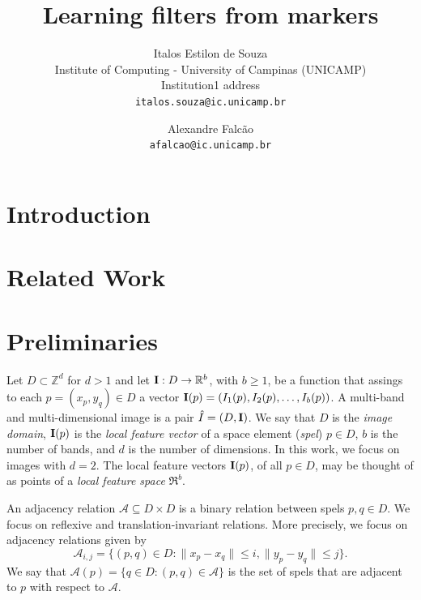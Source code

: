 \documentclass[10pt,twocolumn,letterpaper]{article}
\newcommand{\R}{\mathbb{R}}
\newcommand{\A}{\mathcal{A}}
\newcommand{\Z}{\mathbb{Z}}
\newcommand{\m}[1]{{\mathrm{\bf #1}}}
\begin{document}
\title{Learning filters from markers}
\author{Italos Estilon de Souza\\
Institute of Computing - University of Campinas (UNICAMP)\\
Institution1 address\\
{\tt\small italos.souza@ic.unicamp.br}
\and
Alexandre Falcão\\
{\tt\small afalcao@ic.unicamp.br}
}

\maketitle



\section{Introduction}

\section{Related Work}

\section{Preliminaries}

Let $D \subset \Z^d$ for $d > 1$ and let $\m{I}: D \to \R^b$, with $b \ge 1$, be a function that assings to each $p = (x_p, y_q) \in D$ a vector $\m{I}(p) = (I_1(p), I_2(p), \ldots, I_b(p))$.
A multi-band and multi-dimensional image is a pair ${\hat{I} = (D, \m{I})}$. We say that $D$ is the \textit{image domain}, $\m{I}(p)$ is the \textit{local feature vector} of a space element (\textit{spel}) $p \in D$, $b$ is the number of bands, and $d$ is the number of dimensions. In this work, we focus on images with $d=2$. The local feature vectors $\m{I}(p)$, of all $p\in D$, may be thought of as points of a \textit{local feature space} $\Re^b$.

An adjacency relation $\A \subseteq D \times D$ is a binary relation between spels $p, q \in D$. We focus on reflexive and translation-invariant relations. More precisely, we focus on adjacency relations given by \[\A_{i,j} = \{ (p, q) \in D : \|x_p - x_q\| \le i, \|y_p - y_q\| \le j \}.\] We say that $\A(p) = \{q \in D : (p, q) \in \A\}$ is the set of spels that are adjacent to $p$ with respect to $\A$.
\end{document}
